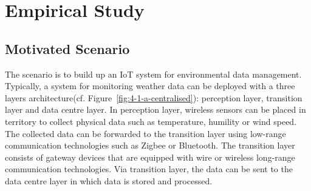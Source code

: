 \chapter{Empirical Study}
\label{ch:Empirical study}




\section{Motivated Scenario}

The scenario is to build up an  IoT system for environmental data management.
Typically, a system for monitoring weather data can be deployed with a three layers architecture(cf. Figure~\ref{fig:4-1-a-centralised}): perception layer, transition layer and data centre layer.
In perception layer, wireless sensors can be placed in territory to collect physical data such as temperature, humility or wind speed.
The collected data can be forwarded to the transition layer using low-range communication technologies such as Zigbee or Bluetooth. 
The transition layer consists of gateway devices that are equipped with wire or wireless long-range communication technologies.
Via transition layer, the data can be sent to the data centre layer in which data is stored and processed.


